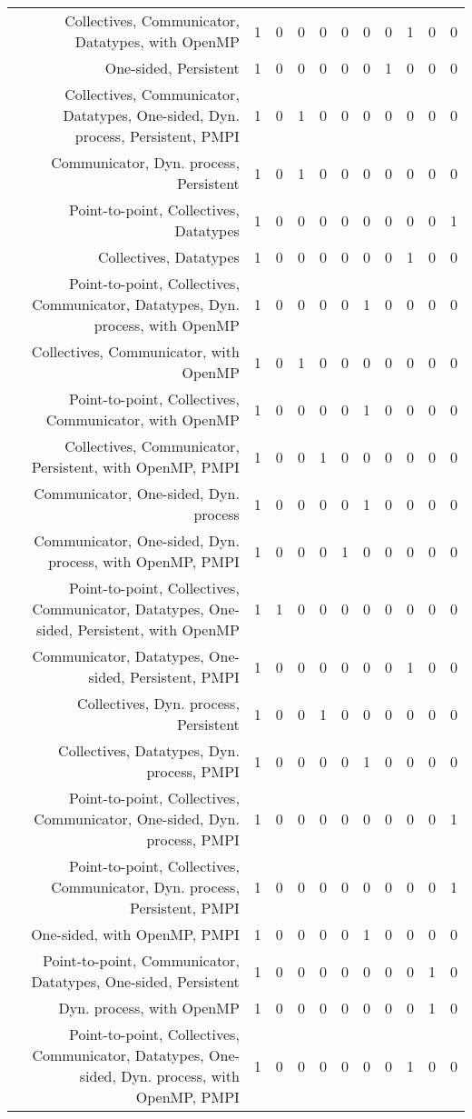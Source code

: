 {\begin{landscape}
\begin{longtable}[htb]{r|c|c|c|c|c|c|c|c|c|c}
{Collectives, Communicator, Datatypes, with OpenMP} & 1 & 0 & 0 & 0 & 0 & 0 & 0 & 1 & 0 & 0 \\%
{One-sided, Persistent} & 1 & 0 & 0 & 0 & 0 & 0 & 1 & 0 & 0 & 0 \\%
{Collectives, Communicator, Datatypes, One-sided, Dyn. process, Persistent, PMPI} & 1 & 0 & 1 & 0 & 0 & 0 & 0 & 0 & 0 & 0 \\%
{Communicator, Dyn. process, Persistent} & 1 & 0 & 1 & 0 & 0 & 0 & 0 & 0 & 0 & 0 \\%
{Point-to-point, Collectives, Datatypes} & 1 & 0 & 0 & 0 & 0 & 0 & 0 & 0 & 0 & 1 \\%
{Collectives, Datatypes} & 1 & 0 & 0 & 0 & 0 & 0 & 0 & 1 & 0 & 0 \\%
{Point-to-point, Collectives, Communicator, Datatypes, Dyn. process, with OpenMP} & 1 & 0 & 0 & 0 & 0 & 1 & 0 & 0 & 0 & 0 \\%
{Collectives, Communicator, with OpenMP} & 1 & 0 & 1 & 0 & 0 & 0 & 0 & 0 & 0 & 0 \\%
{Point-to-point, Collectives, Communicator, with OpenMP} & 1 & 0 & 0 & 0 & 0 & 1 & 0 & 0 & 0 & 0 \\%
{Collectives, Communicator, Persistent, with OpenMP, PMPI} & 1 & 0 & 0 & 1 & 0 & 0 & 0 & 0 & 0 & 0 \\%
{Communicator, One-sided, Dyn. process} & 1 & 0 & 0 & 0 & 0 & 1 & 0 & 0 & 0 & 0 \\%
{Communicator, One-sided, Dyn. process, with OpenMP, PMPI} & 1 & 0 & 0 & 0 & 1 & 0 & 0 & 0 & 0 & 0 \\%
{Point-to-point, Collectives, Communicator, Datatypes, One-sided, Persistent, with OpenMP} & 1 & 1 & 0 & 0 & 0 & 0 & 0 & 0 & 0 & 0 \\%
{Communicator, Datatypes, One-sided, Persistent, PMPI} & 1 & 0 & 0 & 0 & 0 & 0 & 0 & 1 & 0 & 0 \\%
{Collectives, Dyn. process, Persistent} & 1 & 0 & 0 & 1 & 0 & 0 & 0 & 0 & 0 & 0 \\%
{Collectives, Datatypes, Dyn. process, PMPI} & 1 & 0 & 0 & 0 & 0 & 1 & 0 & 0 & 0 & 0 \\%
{Point-to-point, Collectives, Communicator, One-sided, Dyn. process, PMPI} & 1 & 0 & 0 & 0 & 0 & 0 & 0 & 0 & 0 & 1 \\%
{Point-to-point, Collectives, Communicator, Dyn. process, Persistent, PMPI} & 1 & 0 & 0 & 0 & 0 & 0 & 0 & 0 & 0 & 1 \\%
{One-sided, with OpenMP, PMPI} & 1 & 0 & 0 & 0 & 0 & 1 & 0 & 0 & 0 & 0 \\%
{Point-to-point, Communicator, Datatypes, One-sided, Persistent} & 1 & 0 & 0 & 0 & 0 & 0 & 0 & 0 & 1 & 0 \\%
{Dyn. process, with OpenMP} & 1 & 0 & 0 & 0 & 0 & 0 & 0 & 0 & 1 & 0 \\%
{Point-to-point, Collectives, Communicator, Datatypes, One-sided, Dyn. process, with OpenMP, PMPI} & 1 & 0 & 0 & 0 & 0 & 0 & 0 & 1 & 0 & 0 \\%
\hline%
\end{longtable}%
\end{landscape}}%
\clearpage%
